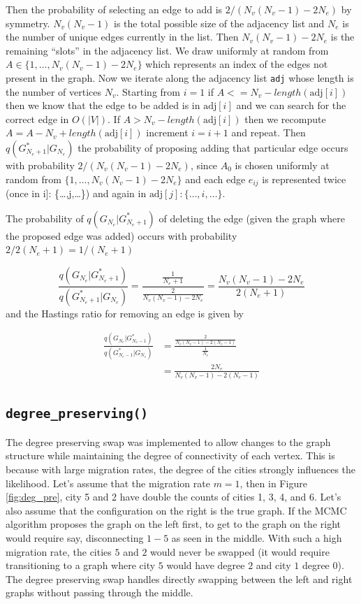 \documentclass[11pt,a4paper]{article}
\numberwithin{equation}{section}
\begin{document}
Then the probability of selecting an edge to add is
\(2/(N_v(N_v-1) - 2N_e)\) by symmetry. \(N_v(N_v-1)\) is the total
possible size of the adjacency list and \(N_e\) is the number of unique
edges currently in the list. Then \(N_v(N_v-1) - 2N_e\) is the remaining
``slots'' in the adjacency list. We draw uniformly at random from
\(A \in \{1,\dots,N_v(N_v-1) - 2N_e\}\) which represents an index of the
edges not present in the graph. Now we iterate along the adjacency list
\texttt{adj} whose length is the number of vertices \(N_v\). Starting
from \(i = 1\) if \(A <= N_v - length(\text{adj}[i])\) then we know that
the edge to be added is in \(\text{adj}[i]\) and we can search for the
correct edge in \(O(|V|)\). If \(A > N_v - length(\text{adj}[i])\) then
we recompute \(A = A - N_v + length(\text{adj}[i])\) increment
\(i = i + 1\) and repeat. Then \(q(G^*_{N_e+1}|G_{N_e})\) the
probability of proposing adding that particular edge occurs with
probability \(2/(N_v(N_v-1) - 2N_e)\), since \(A_0\) is chosen uniformly
at random from \(\{1,\dots,N_v(N_v-1) - 2N_e\}\) and each edge
\(e_{ij}\) is represented twice (once in \text{adj}{[}i{]}:
\{\dots,j,\dots\}) and again in \(\text{adj}[j]: \{\dots,i,\dots\}\).

The probability of \(q(G_{N_e}|G^*_{N_e+1})\) of deleting the edge
(given the graph where the proposed edge was added) occurs with
probability \(2/2(N_e+1) = 1/(N_e+1)\)

\[\frac{q(G_{N_e}|G^*_{N_e+1})}{q(G^*_{N_e+1}|G_{N_e})} = \frac{\frac{1}{N_e+1}}{\frac{2}{N_v(N_v-1) - 2N_e}} = \frac{N_v(N_v-1) - 2N_e}{2(N_e+1)} \]
and the Hastings ratio for removing an edge is given by

\[ \begin{aligned} \frac{q(G_{N_e}|G^*_{N_e-1})}{q(G^*_{N_e-1}|G_{N_e})} & = \frac{\frac{2}{N_v(N_v-1) - 2(N_e-1)}}{\frac{1}{N_e}} \\ &= \frac{2N_e}{N_v(N_v-1) - 2(N_e-1)} \end{aligned} \]

\hypertarget{degree_preserving}{%
\subsection{\texorpdfstring{\texttt{degree\_preserving()}}{degree\_preserving()}}\label{degree_preserving}}

The degree preserving swap was implemented to allow changes to the graph
structure while maintaining the degree of connectivity of each vertex.
This is because with large migration rates, the degree of the cities
strongly influences the likelihood. Let's assume that the migration rate
\(m = 1\), then in Figure \ref{fig:deg_pre}, city 5 and 2 have double
the counts of cities 1, 3, 4, and 6. Let's also assume that the
configuration on the right is the true graph. If the MCMC algorithm
proposes the graph on the left first, to get to the graph on the right
would require say, disconnecting \(1-5\) as seen in the middle. With
such a high migration rate, the cities \(5\) and \(2\) would never be
swapped (it would require transitioning to a graph where city \(5\)
would have degree \(2\) and city \(1\) degree 0). The degree preserving
swap handles directly swapping between the left and right graphs without
passing through the middle.
\end{document}
